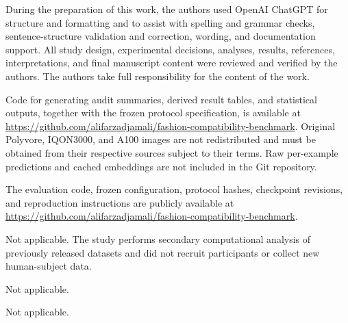 \documentclass[pdflatex,sn-mathphys-num,iicol]{sn-jnl}
\begin{document}
During the preparation of this work, the authors used OpenAI ChatGPT for structure and formatting and to assist with spelling and grammar checks, sentence-structure validation and correction, wording, and documentation support. All study design, experimental decisions, analyses, results, references, interpretations, and final manuscript content were reviewed and verified by the authors. The authors take full responsibility for the content of the work.

Code for generating audit summaries, derived result tables, and statistical outputs, together with the frozen protocol specification, is available at \url{https://github.com/alifarzadjamali/fashion-compatibility-benchmark}. Original Polyvore, IQON3000, and A100 images are not redistributed and must be obtained from their respective sources subject to their terms. Raw per-example predictions and cached embeddings are not included in the Git repository.

The evaluation code, frozen configuration, protocol hashes, checkpoint revisions, and reproduction instructions are publicly available at \url{https://github.com/alifarzadjamali/fashion-compatibility-benchmark}.

Not applicable. The study performs secondary computational analysis of previously released datasets and did not recruit participants or collect new human-subject data.

Not applicable.

Not applicable.

\sloppy

\end{document}
